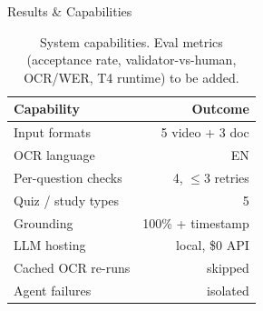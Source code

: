 \documentclass[final]{beamer}
\newlength{\sepwidth}
\newlength{\colwidth}
\newcommand{\separatorcolumn}{\begin{column}{\sepwidth}\end{column}}
\begin{document}
\begin{frame}[t]
\begin{columns}[t]
\begin{column}{\colwidth}
\begin{block}{Results \& Capabilities}
    \begin{table}
      \centering
      \begin{tabular}{l r}
        \toprule
        \textbf{Capability} & \textbf{Outcome} \\
        \midrule
        Input formats        & 5 video + 3 doc \\
        OCR language         & EN \\
        Per-question checks   & 4, $\le 3$ retries \\
        Quiz / study types    & 5 \\
        Grounding            & 100\% + timestamp \\
        LLM hosting          & local, \$0 API \\
        Cached OCR re-runs    & skipped \\
        Agent failures       & isolated \\
        \bottomrule
      \end{tabular}
      \caption{System capabilities. Eval metrics (acceptance rate, validator-vs-human,
      OCR/WER, T4 runtime) to be added.}
    \end{table}

  \end{block}

\end{column}

\separatorcolumn
\end{columns}
\end{frame}
\end{document}

